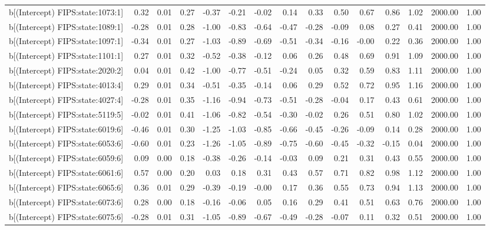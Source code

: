 \begin{table}[ht]
\begin{tabular}{rrrrrrrrrrrrrrr}
  b[(Intercept) FIPS:state:1073:1] & 0.32 & 0.01 & 0.27 & -0.37 & -0.21 & -0.02 & 0.14 & 0.33 & 0.50 & 0.67 & 0.86 & 1.02 & 2000.00 & 1.00 \\ 
  b[(Intercept) FIPS:state:1089:1] & -0.28 & 0.01 & 0.28 & -1.00 & -0.83 & -0.64 & -0.47 & -0.28 & -0.09 & 0.08 & 0.27 & 0.41 & 2000.00 & 1.00 \\ 
  b[(Intercept) FIPS:state:1097:1] & -0.34 & 0.01 & 0.27 & -1.03 & -0.89 & -0.69 & -0.51 & -0.34 & -0.16 & -0.00 & 0.22 & 0.36 & 2000.00 & 1.00 \\ 
  b[(Intercept) FIPS:state:1101:1] & 0.27 & 0.01 & 0.32 & -0.52 & -0.38 & -0.12 & 0.06 & 0.26 & 0.48 & 0.69 & 0.91 & 1.09 & 2000.00 & 1.00 \\ 
  b[(Intercept) FIPS:state:2020:2] & 0.04 & 0.01 & 0.42 & -1.00 & -0.77 & -0.51 & -0.24 & 0.05 & 0.32 & 0.59 & 0.83 & 1.11 & 2000.00 & 1.00 \\ 
  b[(Intercept) FIPS:state:4013:4] & 0.29 & 0.01 & 0.34 & -0.51 & -0.35 & -0.14 & 0.06 & 0.29 & 0.52 & 0.72 & 0.95 & 1.16 & 2000.00 & 1.00 \\ 
  b[(Intercept) FIPS:state:4027:4] & -0.28 & 0.01 & 0.35 & -1.16 & -0.94 & -0.73 & -0.51 & -0.28 & -0.04 & 0.17 & 0.43 & 0.61 & 2000.00 & 1.00 \\ 
  b[(Intercept) FIPS:state:5119:5] & -0.02 & 0.01 & 0.41 & -1.06 & -0.82 & -0.54 & -0.30 & -0.02 & 0.26 & 0.51 & 0.80 & 1.02 & 2000.00 & 1.00 \\ 
  b[(Intercept) FIPS:state:6019:6] & -0.46 & 0.01 & 0.30 & -1.25 & -1.03 & -0.85 & -0.66 & -0.45 & -0.26 & -0.09 & 0.14 & 0.28 & 2000.00 & 1.00 \\ 
  b[(Intercept) FIPS:state:6053:6] & -0.60 & 0.01 & 0.23 & -1.26 & -1.05 & -0.89 & -0.75 & -0.60 & -0.45 & -0.32 & -0.15 & 0.04 & 2000.00 & 1.00 \\ 
  b[(Intercept) FIPS:state:6059:6] & 0.09 & 0.00 & 0.18 & -0.38 & -0.26 & -0.14 & -0.03 & 0.09 & 0.21 & 0.31 & 0.43 & 0.55 & 2000.00 & 1.00 \\ 
  b[(Intercept) FIPS:state:6061:6] & 0.57 & 0.00 & 0.20 & 0.03 & 0.18 & 0.31 & 0.43 & 0.57 & 0.71 & 0.82 & 0.98 & 1.12 & 2000.00 & 1.00 \\ 
  b[(Intercept) FIPS:state:6065:6] & 0.36 & 0.01 & 0.29 & -0.39 & -0.19 & -0.00 & 0.17 & 0.36 & 0.55 & 0.73 & 0.94 & 1.13 & 2000.00 & 1.00 \\ 
  b[(Intercept) FIPS:state:6073:6] & 0.28 & 0.00 & 0.18 & -0.16 & -0.06 & 0.05 & 0.16 & 0.29 & 0.41 & 0.51 & 0.63 & 0.76 & 2000.00 & 1.00 \\ 
  b[(Intercept) FIPS:state:6075:6] & -0.28 & 0.01 & 0.31 & -1.05 & -0.89 & -0.67 & -0.49 & -0.28 & -0.07 & 0.11 & 0.32 & 0.51 & 2000.00 & 1.00 \\ 

\end{tabular}
\end{table}
